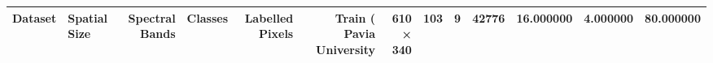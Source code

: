 \begin{tabular}{llrrrrrr}
\toprule
Dataset & Spatial Size & Spectral Bands & Classes & Labelled Pixels & Train (%
\midrule
Pavia University & 610 × 340 & 103 & 9 & 42776 & 16.000000 & 4.000000 & 80.000000 \\
\bottomrule
\end{tabular}

